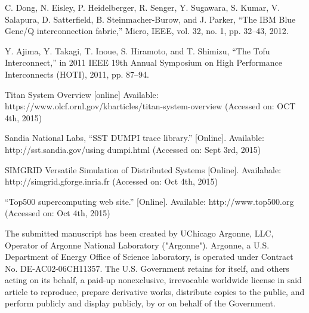 \documentclass[conference]{IEEEtran}
\begin{document}
\begin{thebibliography}{10}
C. Dong, N. Eisley, P. Heidelberger, R. Senger, Y. Sugawara, S. Kumar, V. Salapura, D. Satterfield, B. Steinmacher-Burow, and J. Parker, 
\newblock “The IBM Blue Gene/Q interconnection fabric,” 
\newblock Micro, IEEE, vol. 32, no. 1, pp. 32–43, 2012.

Y. Ajima, Y. Takagi, T. Inoue, S. Hiramoto, and T. Shimizu, 
\newblock “The Tofu Interconnect,” 
\newblock in 2011 IEEE 19th Annual Symposium on High Performance Interconnects (HOTI), 2011, pp. 87–94.

Titan System Overview [online]
\newblock Available: https://www.olcf.ornl.gov/kbarticles/titan-system-overview
\newblock (Accessed on: OCT 4th, 2015)


Sandia National Labs, “SST DUMPI trace library.” [Online].
\newblock Available: http://sst.sandia.gov/using dumpi.html 
\newblock (Accessed on: Sept 3rd, 2015)

SIMGRID Versatile Simulation of Distributed Systems [Online].
\newblock Availabale: http://simgrid.gforge.inria.fr
\newblock (Accessed on: Oct 4th, 2015)

“Top500 supercomputing web site.” [Online]. 
\newblock Available: http://www.top500.org
\newblock (Accessed on: Oct 4th, 2015)


\end{thebibliography}


\vspace{5\baselineskip}
The submitted manuscript has been created by UChicago Argonne, LLC, Operator of Argonne National Laboratory ("Argonne").  Argonne, a U.S. Department of Energy Office of Science laboratory, is operated under Contract No. DE-AC02-06CH11357.  The U.S. Government retains for itself, and others acting on its behalf, a paid-up nonexclusive, irrevocable worldwide license in said article to reproduce, prepare derivative works, distribute copies to the public, and perform publicly and display publicly, by or on behalf of the Government.
\end{document}
